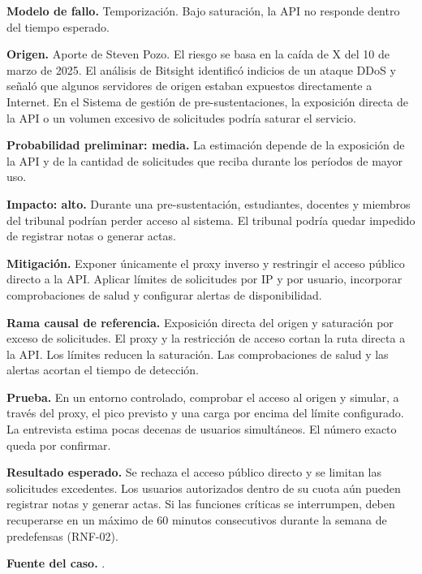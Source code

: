 \textbf{Modelo de fallo.} Temporización. Bajo saturación, la API no responde dentro del tiempo esperado.

\textbf{Origen.} Aporte de Steven Pozo. El riesgo se basa en la caída de X del 10 de marzo de 2025. El análisis de Bitsight identificó indicios de un ataque DDoS y señaló que algunos servidores de origen estaban expuestos directamente a Internet. En el Sistema de gestión de pre-sustentaciones, la exposición directa de la API o un volumen excesivo de solicitudes podría saturar el servicio.

\textbf{Probabilidad preliminar: media.} La estimación depende de la exposición de la API y de la cantidad de solicitudes que reciba durante los períodos de mayor uso.

\textbf{Impacto: alto.} Durante una pre-sustentación, estudiantes, docentes y miembros del tribunal podrían perder acceso al sistema. El tribunal podría quedar impedido de registrar notas o generar actas.

\textbf{Mitigación.} Exponer únicamente el proxy inverso y restringir el acceso público directo a la API. Aplicar límites de solicitudes por IP y por usuario, incorporar comprobaciones de salud y configurar alertas de disponibilidad.

\textbf{Rama causal de referencia.} Exposición directa del origen y saturación por exceso de solicitudes. El proxy y la restricción de acceso cortan la ruta directa a la API. Los límites reducen la saturación. Las comprobaciones de salud y las alertas acortan el tiempo de detección.

\textbf{Prueba.} En un entorno controlado, comprobar el acceso al origen y simular, a través del proxy, el pico previsto y una carga por encima del límite configurado. La entrevista estima pocas decenas de usuarios simultáneos. El número exacto queda por confirmar.

\textbf{Resultado esperado.} Se rechaza el acceso público directo y se limitan las solicitudes excedentes. Los usuarios autorizados dentro de su cuota aún pueden registrar notas y generar actas. Si las funciones críticas se interrumpen, deben recuperarse en un máximo de 60 minutos consecutivos durante la semana de predefensas (RNF-02).

\textbf{Fuente del caso.} \cite{Umbelino2025BitsightDDoS}.
